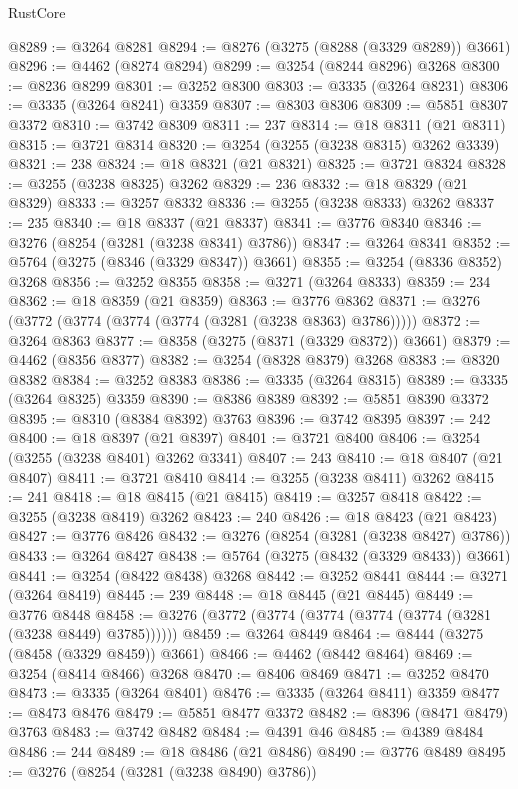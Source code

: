 \begin{lexlean}{RustCore}
\begin{coremodule}
@8289 := @3264 @8281
@8294 := @8276 (@3275 (@8288 (@3329 @8289)) @3661)
@8296 := @4462 (@8274 @8294)
@8299 := @3254 (@8244 @8296) @3268
@8300 := @8236 @8299
@8301 := @3252 @8300
@8303 := @3335 (@3264 @8231)
@8306 := @3335 (@3264 @8241) @3359
@8307 := @8303 @8306
@8309 := @5851 @8307 @3372
@8310 := @3742 @8309
@8311 := 237
@8314 := @18 @8311 (@21 @8311)
@8315 := @3721 @8314
@8320 := @3254 (@3255 (@3238 @8315) @3262 @3339)
@8321 := 238
@8324 := @18 @8321 (@21 @8321)
@8325 := @3721 @8324
@8328 := @3255 (@3238 @8325) @3262
@8329 := 236
@8332 := @18 @8329 (@21 @8329)
@8333 := @3257 @8332
@8336 := @3255 (@3238 @8333) @3262
@8337 := 235
@8340 := @18 @8337 (@21 @8337)
@8341 := @3776 @8340
@8346 := @3276 (@8254 (@3281 (@3238 @8341) @3786))
@8347 := @3264 @8341
@8352 := @5764 (@3275 (@8346 (@3329 @8347)) @3661)
@8355 := @3254 (@8336 @8352) @3268
@8356 := @3252 @8355
@8358 := @3271 (@3264 @8333)
@8359 := 234
@8362 := @18 @8359 (@21 @8359)
@8363 := @3776 @8362
@8371 := @3276 (@3772 (@3774 (@3774 (@3774 (@3281 (@3238 @8363) @3786)))))
@8372 := @3264 @8363
@8377 := @8358 (@3275 (@8371 (@3329 @8372)) @3661)
@8379 := @4462 (@8356 @8377)
@8382 := @3254 (@8328 @8379) @3268
@8383 := @8320 @8382
@8384 := @3252 @8383
@8386 := @3335 (@3264 @8315)
@8389 := @3335 (@3264 @8325) @3359
@8390 := @8386 @8389
@8392 := @5851 @8390 @3372
@8395 := @8310 (@8384 @8392) @3763
@8396 := @3742 @8395
@8397 := 242
@8400 := @18 @8397 (@21 @8397)
@8401 := @3721 @8400
@8406 := @3254 (@3255 (@3238 @8401) @3262 @3341)
@8407 := 243
@8410 := @18 @8407 (@21 @8407)
@8411 := @3721 @8410
@8414 := @3255 (@3238 @8411) @3262
@8415 := 241
@8418 := @18 @8415 (@21 @8415)
@8419 := @3257 @8418
@8422 := @3255 (@3238 @8419) @3262
@8423 := 240
@8426 := @18 @8423 (@21 @8423)
@8427 := @3776 @8426
@8432 := @3276 (@8254 (@3281 (@3238 @8427) @3786))
@8433 := @3264 @8427
@8438 := @5764 (@3275 (@8432 (@3329 @8433)) @3661)
@8441 := @3254 (@8422 @8438) @3268
@8442 := @3252 @8441
@8444 := @3271 (@3264 @8419)
@8445 := 239
@8448 := @18 @8445 (@21 @8445)
@8449 := @3776 @8448
@8458 := @3276 (@3772 (@3774 (@3774 (@3774 (@3774 (@3281 (@3238 @8449) @3785))))))
@8459 := @3264 @8449
@8464 := @8444 (@3275 (@8458 (@3329 @8459)) @3661)
@8466 := @4462 (@8442 @8464)
@8469 := @3254 (@8414 @8466) @3268
@8470 := @8406 @8469
@8471 := @3252 @8470
@8473 := @3335 (@3264 @8401)
@8476 := @3335 (@3264 @8411) @3359
@8477 := @8473 @8476
@8479 := @5851 @8477 @3372
@8482 := @8396 (@8471 @8479) @3763
@8483 := @3742 @8482
@8484 := @4391 @46
@8485 := @4389 @8484
@8486 := 244
@8489 := @18 @8486 (@21 @8486)
@8490 := @3776 @8489
@8495 := @3276 (@8254 (@3281 (@3238 @8490) @3786))

\end{coremodule}
\end{lexlean}
